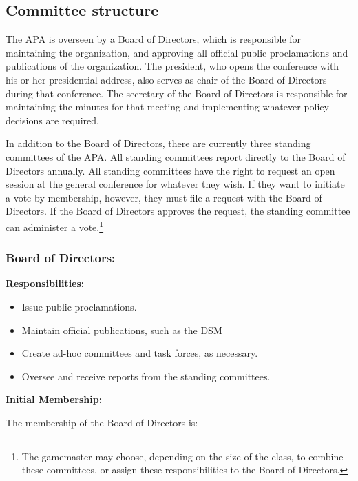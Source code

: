 \subsection{Committee structure}
\label{committeestructure}

The APA is overseen by a Board of Directors, which is responsible for maintaining the organization, and approving all official public proclamations and publications of the organization. The president, who opens the conference with his or her presidential address, also serves as chair of the Board of Directors during that conference. The secretary of the Board of Directors is responsible for maintaining the minutes for that meeting and implementing whatever policy decisions are required.

In addition to the Board of Directors, there are currently three standing committees of the APA. All standing committees report directly to the Board of Directors annually. All standing committees have the right to request an open session at the general conference for whatever they wish. If they want to initiate a vote by membership, however, they must file a request with the Board of Directors. If the Board of Directors approves the request, the standing committee can administer a vote.\footnote{The gamemaster may choose, depending on the size of the class, to combine these committees, or assign these responsibilities to the Board of Directors.}

\subsubsection{Board of Directors:}
\label{boardofdirectors:}

\textbf{Responsibilities:}

\begin{itemize}
\item Issue public proclamations.

\item Maintain official publications, such as the DSM

\item Create ad-hoc committees and task forces, as necessary.

\item Oversee and receive reports from the standing committees.

\end{itemize}

\textbf{Initial Membership:}

The membership of the Board of Directors is:

